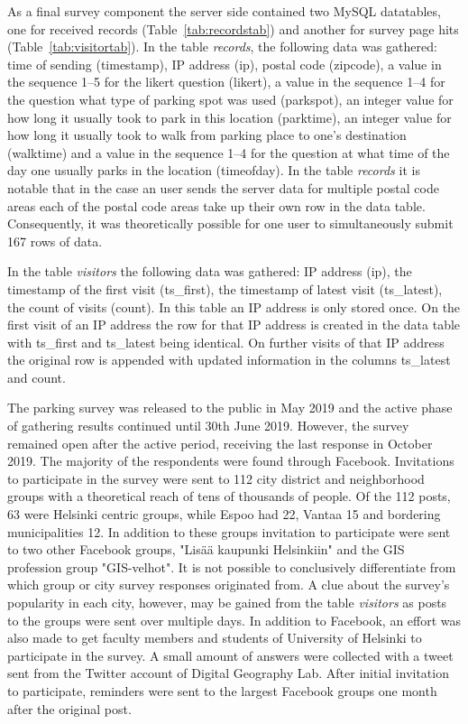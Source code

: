 As a final survey component the server side contained two MySQL datatables, one for received records (Table~\ref{tab:recordstab}) and another for survey page hits (Table~\ref{tab:visitortab}). In the table \textit{records}, the following data was gathered: time of sending (timestamp), IP address (ip), postal code (zipcode), a value in the sequence 1--5 for the likert question (likert), a value in the sequence 1--4 for the question what type of parking spot was used (parkspot), an integer value for how long it usually took to park in this location (parktime), an integer value for how long it usually took to walk from parking place to one's destination (walktime) and a value in the sequence 1--4 for the question at what time of the day one usually parks in the location (timeofday). In the table \textit{records} it is notable that in the case an user sends the server data for multiple postal code areas each of the postal code areas take up their own row in the data table. Consequently, it was theoretically possible for one user to simultaneously submit 167 rows of data.

In the table \textit{visitors} the following data was gathered: IP address (ip), the timestamp of the first visit (ts\_first), the timestamp of latest visit (ts\_latest), the count of visits (count). In this table an IP address is only stored once. On the first visit of an IP address the row for that IP address is created in the data table with ts\_first and ts\_latest being identical. On further visits of that IP address the original row is appended with updated information in the columns ts\_latest and count.

The parking survey was released to the public in May 2019 and the active phase of gathering results continued until 30th June 2019. However, the survey remained open after the active period, receiving the last response in October 2019. The majority of the respondents were found through Facebook. Invitations to participate in the survey were sent to 112 city district and neighborhood groups with a theoretical reach of tens of thousands of people. Of the 112 posts, 63 were Helsinki centric groups, while Espoo had 22, Vantaa 15 and bordering municipalities 12. In addition to these groups invitation to participate were sent to two other Facebook groups, "Lisää kaupunki Helsinkiin" and the GIS profession group "GIS-velhot". It is not possible to conclusively differentiate from which group or city survey responses originated from. A clue about the survey's popularity in each city, however, may be gained from the table \textit{visitors} as posts to the groups were sent over multiple days. In addition to Facebook, an effort was also made to get faculty members and students of University of Helsinki to participate in the survey. A small amount of answers were collected with a tweet sent from the Twitter account of Digital Geography Lab. After initial invitation to participate, reminders were sent to the largest Facebook groups one month after the original post.

